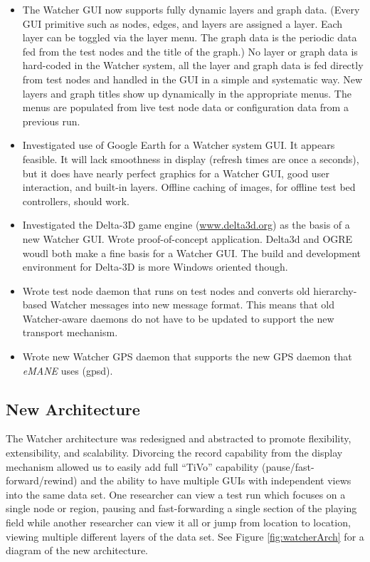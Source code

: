 \documentclass{report}
\begin{document}
\begin{itemize}
\item The Watcher GUI now supports fully dynamic layers and graph data. (Every GUI primitive such as nodes, edges, and layers are assigned a layer. Each layer can be
toggled via the layer menu. The graph data is the periodic data fed from the test nodes and the title of the graph.) No layer or graph data is hard-coded in the Watcher system, all 
the layer and graph data is fed directly from test nodes and handled in the GUI in a simple and systematic way. New layers and graph titles show up dynamically in the appropriate 
menus. The menus are populated from live test node data or configuration data from a previous run.
\item Investigated use of Google Earth for a Watcher system GUI. It appears feasible. It will lack smoothness in display (refresh times are once a seconds), but it 
does have nearly perfect graphics for a Watcher GUI, good user interaction, and built-in layers. Offline caching of images, for offline test bed controllers, should work. 
\item Investigated the Delta-3D game engine (\url{www.delta3d.org}) as the basis of a new Watcher GUI. Wrote proof-of-concept application. Delta3d and OGRE woudl both make 
a fine basis for a Watcher GUI. The build and development environment for Delta-3D is more Windows oriented though. 
\item Wrote test node daemon that runs on test nodes and converts old hierarchy-based Watcher messages into new message format. 
This means that old Watcher-aware daemons do not have to be updated to support the new transport mechanism.
\item Wrote new Watcher GPS daemon that supports the new GPS daemon that {\it eMANE} uses (gpsd). 
\end{itemize}

\subsection{New Architecture}
\label{newArch}

The Watcher architecture was redesigned and abstracted to promote flexibility, extensibility, and scalability.  Divorcing the record 
capability from the display mechanism allowed us to easily add full ``TiVo'' capability (pause\slash fast-forward\slash rewind) and the ability to have multiple 
GUIs with independent views into the same data set. One researcher can view a test run which focuses on a single node or region, 
pausing and fast-forwarding a single section of the playing field while another researcher can view it all or jump from 
location to location, viewing multiple different layers of the data set. See Figure \ref{fig:watcherArch} for a diagram 
of the new architecture.
\end{document}
